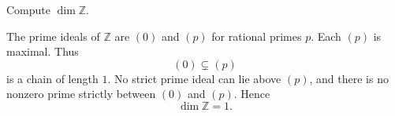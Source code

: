 \begin{problem}\label{prob:vi29-04}
Compute \(\dim\mathbb Z\).

\end{problem}

\ifdefined\FullProblemDossiers
\begin{solution}
The prime ideals of \(\mathbb Z\) are \((0)\) and \((p)\) for rational primes \(p\).  Each \((p)\) is maximal.
Thus
\[
(0)\subsetneq(p)
\]
is a chain of length \(1\).  No strict prime ideal can lie above \((p)\), and there is no nonzero prime strictly
between \((0)\) and \((p)\).  Hence
\[
\boxed{\dim\mathbb Z=1}.
\]
\end{solution}
\fi
